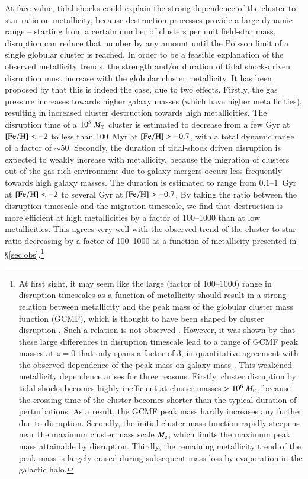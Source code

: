 \documentclass{aa}
\begin{document}
At face value, tidal shocks could explain the strong dependence of the cluster-to-star ratio on metallicity, because destruction processes provide a large dynamic range -- starting from a certain number of clusters per unit field-star mass, disruption can reduce that number by any amount until the Poisson limit of a single globular cluster is reached. In order to be a feasible explanation of the observed metallicity trends, the strength and/or duration of tidal shock-driven disruption must increase with the globular cluster metallicity. It has been proposed by \citet{kruijssen15b} that this is indeed the case, due to two effects. Firstly, the gas pressure increases towards higher galaxy masses (which have higher metallicities), resulting in increased cluster destruction towards high metallicities. The disruption time of a $10^5~\mbox{$M_{\odot}$}$ cluster is estimated to decrease from a few Gyr at ${\rm [Fe/H]}<-2$ to less than 100~Myr at ${\rm [Fe/H]}>-0.7$, with a total dynamic range of a factor of $\sim50$. Secondly, the duration of tidal-shock driven disruption is expected to weakly increase with metallicity, because the migration of clusters out of the gas-rich environment due to galaxy mergers occurs less frequently towards high galaxy masses. The duration is estimated to range from $0.1$--$1$~Gyr at ${\rm [Fe/H]}<-2$ to several Gyr at ${\rm [Fe/H]}>-0.7$. By taking the ratio between the disruption timescale and the migration timescale, we find that destruction is more efficient at high metallicities by a factor of 100--1000 than at low metallicities. 
This agrees very well with the observed trend of the cluster-to-star ratio decreasing by a factor of 100--1000 as a function of metallicity presented in \S\ref{sec:obs}.\footnote{At first sight, it may seem like the large (factor of 100--1000) range in disruption timescales as a function of metallicity should result in a strong relation between metallicity and the peak mass of the globular cluster mass function (GCMF), which is thought to have been shaped by cluster disruption \citep[e.g.][]{elmegreen97,fall01}. Such a relation is not observed \citep{jordan07}. However, it was shown by \citet[Figure~3]{kruijssen15b} that these large differences in disruption timescale lead to a range of GCMF peak masses at $z=0$ that only spans a factor of 3, in quantitative agreement with the observed dependence of the peak mass on galaxy mass \citep{jordan07}. This weakened metallicity dependence arises for three reasons. Firstly, cluster disruption by tidal shocks becomes highly inefficient at cluster masses $>10^6~\mbox{$M_{\odot}$}$, because the crossing time of the cluster becomes shorter than the typical duration of perturbations. As a result, the GCMF peak mass hardly increases any further due to disruption. Secondly, the initial cluster mass function rapidly steepens near the maximum cluster mass scale $M_{\rm c}$, which limits the maximum peak mass attainable by disruption. Thirdly, the remaining metallicity trend of the peak mass is largely erased during subsequent mass loss by evaporation in the galactic halo.}
\end{document}
